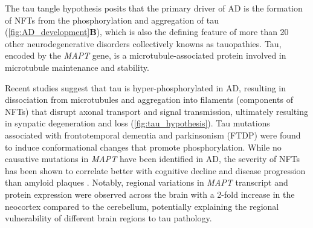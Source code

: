 \newpage
{} 
The tau tangle hypothesis posits that the primary driver of AD is the formation of NFTs from the phosphorylation and aggregation of tau\cite{KS1986} (\cref{fig:AD_development}\textbf{B}), which is also the defining feature of more than 20 other neurodegenerative disorders collectively knowns as tauopathies\cite{Orr2017}. Tau, encoded by the \textit{MAPT} gene, is a microtubule-associated protein involved in microtubule maintenance and stability. 

Recent studies suggest that tau is hyper-phosphorylated in AD, resulting in dissociation from microtubules and aggregation into filaments\cite{Grundke-Iqbal1986,Grundke-Iqbal1986a} (components of NFTs) that disrupt axonal transport and signal transmission, ultimately resulting in synpatic degeneration and loss\cite{Coomans2021} (\cref{fig:tau_hypothesis}). Tau mutations associated with frontotemporal dementia and parkinsonism (FTDP)  were found to induce conformational changes that promote phosphorylation\cite{Alonso2004}. While no causative mutations in \textit{MAPT} have been identified in AD, the severity of NFTs has been shown to correlate better with cognitive decline and disease progression than amyloid plaques \cite{Serrano-Pozo2016,Giannakopoulos2003,PV1992}. Notably, regional variations in \textit{MAPT} transcript and protein expression were observed across the brain with a 2-fold increase in the neocortex compared to the cerebellum, potentially explaining the regional vulnerability of different brain regions to tau pathology\cite{Trabzuni2012}. 

